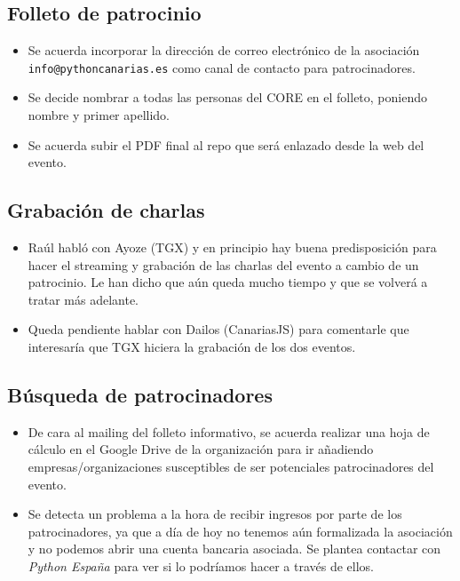 \documentclass[a4paper, 12pt]{article}
\begin{document}
\subsection*{Folleto de patrocinio}

\begin{itemize}
    \item Se acuerda incorporar la dirección de correo electrónico de la asociación \texttt{info@pythoncanarias.es} como canal de contacto para patrocinadores.
    \item Se decide nombrar a todas las personas del CORE en el folleto, poniendo nombre y primer apellido.
    \item Se acuerda subir el PDF final al repo que será enlazado desde la web del evento.
\end{itemize}

\subsection*{Grabación de charlas}

\begin{itemize}
    \item Raúl habló con Ayoze (TGX) y en principio hay buena predisposición para hacer el streaming y grabación de las charlas del evento a cambio de un patrocinio. Le han dicho que aún queda mucho tiempo y que se volverá a tratar más adelante.
    \item Queda pendiente hablar con Dailos (CanariasJS) para comentarle que interesaría que TGX hiciera la grabación de los dos eventos.
\end{itemize}

\subsection*{Búsqueda de patrocinadores}

\begin{itemize}
    \item De cara al mailing del folleto informativo, se acuerda realizar una hoja de cálculo en el Google Drive de la organización para ir añadiendo empresas/organizaciones susceptibles de ser potenciales patrocinadores del evento.
    \item Se detecta un problema a la hora de recibir ingresos por parte de los patrocinadores, ya que a día de hoy no tenemos aún formalizada la asociación y no podemos abrir una cuenta bancaria asociada. Se plantea contactar con \textit{Python España} para ver si lo podríamos hacer a través de ellos.
\end{itemize}
\end{document}
